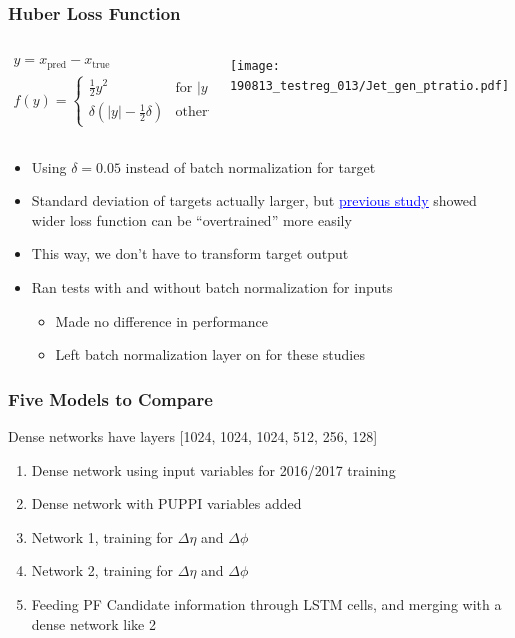 \documentclass{beamer}
\newcommand{\link}[2]{\href{#2}{\textcolor{blue}{\underline{#1}}}}
\begin{document}
\begin{frame}
  \frametitle{Huber Loss Function}

  \begin{columns}
    \begin{column}{0.5\linewidth}
      \begin{gather*}
        y = x_\mathrm{pred} - x_\mathrm{true} \\
        f(y) = \begin{cases}
          \frac12 y^2 & \mbox{for } |y| < \delta \\
          \delta(|y| - \frac12 \delta) & \mbox{otherwise}
        \end{cases}
      \end{gather*}
    \end{column}
    \begin{column}{0.5\linewidth}
      \texttt{[image: 190813\_testreg\_013/Jet\_gen\_ptratio.pdf]}
    \end{column}
  \end{columns}

  \begin{itemize}
  \item Using $\delta = 0.05$ instead of batch normalization for target
  \item Standard deviation of targets actually larger, but
    \link{previous study}{http://t3serv001.mit.edu/~dabercro/docs/hbb/dabercro_hbb_190611.pdf}
    showed wider loss function can be ``overtrained''
    more easily
  \item This way, we don't have to transform target output
  \item Ran tests with and without batch normalization for inputs
    \begin{itemize}
    \item Made no difference in performance
    \item Left batch normalization layer on for these studies
    \end{itemize}
  \end{itemize}

\end{frame}

\begin{frame}
  \frametitle{Five Models to Compare}

  Dense networks have layers [1024, 1024, 1024, 512, 256, 128]

  \begin{enumerate}
  \item Dense network using input variables for 2016/2017 training
  \item Dense network with PUPPI variables added
  \item Network 1, training for $\Delta \eta$ and $\Delta \phi$
  \item Network 2, training for $\Delta \eta$ and $\Delta \phi$
  \item Feeding PF Candidate information through LSTM cells,
    and merging with a dense network like 2
  \end{enumerate}

\end{frame}
\end{document}
